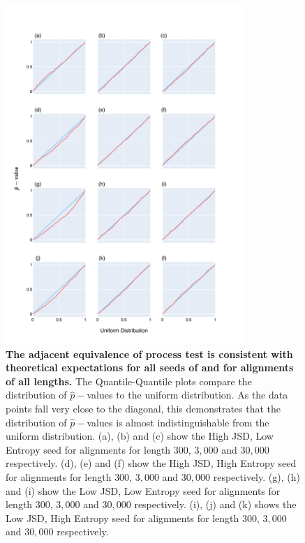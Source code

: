 \begin{figure}[!ht]
\centering
\includegraphics[width=0.8\textwidth]{figures/plots/synthetic/adj_eop/all_seeds.pdf}
\caption[The adjacent equivalence of process test is consistent with theoretical expectations for all seeds of and for alignments of all lengths]{\textbf{The adjacent equivalence of process test is consistent with theoretical expectations for all seeds of and for alignments of all lengths.} The Quantile-Quantile plots compare the distribution of $\hat p-$values to the uniform distribution. As the data points fall very close to the diagonal, this demonstrates that the distribution of $\hat p-$values is almost indistinguishable from the uniform distribution. (a), (b) and (c) show the High JSD, Low Entropy seed for alignments for length $300$, $3,000$ and $30,000$ respectively. (d), (e) and (f) show the High JSD, High Entropy seed for alignments for length $300$, $3,000$ and $30,000$ respectively. (g), (h) and (i) show the Low JSD, Low Entropy seed for alignments for length $300$, $3,000$ and $30,000$ respectively. (i), (j) and (k) shows the Low JSD, High Entropy seed for alignments for length $300$, $3,000$ and $30,000$ respectively.}
\label{fig:synthetic/adj_eop/all_seeds}
\end{figure}